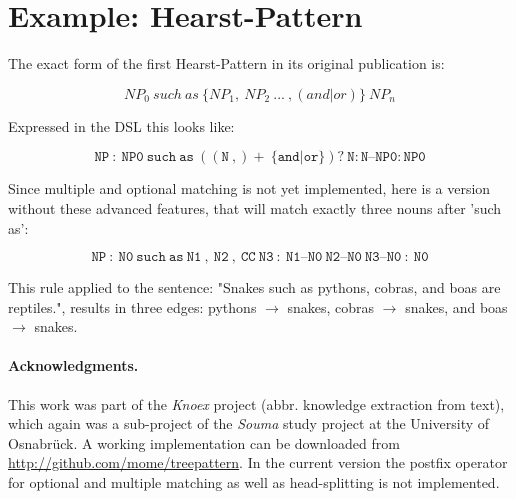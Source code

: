\documentclass[english]{article}
\begin{document}
\section{Example: Hearst-Pattern}

The exact form of the first Hearst-Pattern in its original publication is:

\[
NP_0\ such\ as\ \{NP_1,\ NP_2\ ...\ ,(and|or)\}\ NP_n
\]

Expressed in the DSL this looks like:

\[
\mathtt{NP\ :\ NP0\ such\ as\ ((N\ ,)+\ \{and|or\})?\ N : N\text{--}NP0 : NP0}
\]

Since multiple and optional matching is not yet implemented, here is a version without these advanced features, that will match exactly three nouns after 'such as':

\[
\mathtt{NP\ :\ N0\ such\ as\ N1\ ,\ N2\ ,\ CC\ N3\ :\ N1\text{--}N0\ N2\text{--}N0\ N3\text{--}N0\ :\ N0}
\]

This rule applied to the sentence: "Snakes such as pythons, cobras, and boas are reptiles.", results in three edges: pythons $\rightarrow$ snakes, cobras $\rightarrow$ snakes, and boas $\rightarrow$ snakes.


\paragraph{Acknowledgments.} This work was part of the \textit{Knoex} project (abbr. knowledge
extraction from text), which again was a sub-project of the \textit{Souma} study project at the University of Osnabrück. A working implementation can be downloaded from \url{http://github.com/mome/treepattern}. In the current version the postfix operator for optional and multiple matching as well as head-splitting is not implemented.



\end{document}
